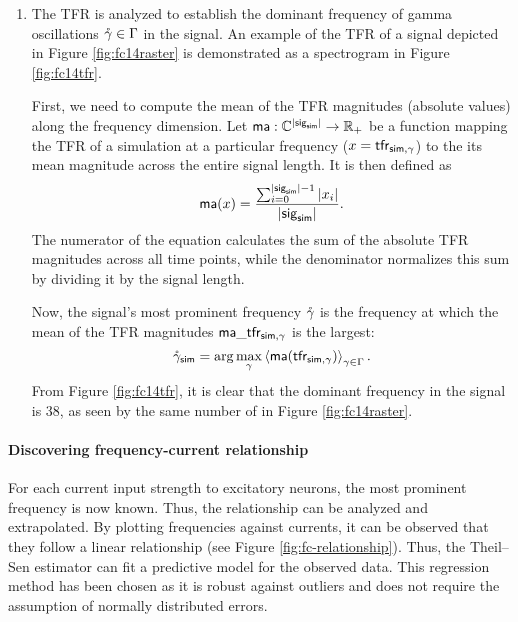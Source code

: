 \begin{enumerate}
    \item The TFR is analyzed to establish the dominant frequency of gamma oscillations $\mathring{\gamma} \in \Gamma$ in the signal. An example of the TFR of a signal depicted in Figure \ref{fig:fc14raster} is demonstrated as a spectrogram in Figure \ref{fig:fc14tfr}.

    First, we need to compute the mean of the TFR magnitudes (absolute values) along the frequency dimension. Let $\mathsf{ma}: \mathbb{C}^{|\mathsf{sig}_{\mathsf{sim}}|} \to \mathbb{R_+}$ be a function mapping the TFR of a simulation at a particular frequency ($x = \mathsf{tfr}_{\mathsf{sim}, \gamma}$) to the its mean magnitude across the entire signal length. It is then defined as
    \begin{equation}
        \mathsf{ma}(x) = 
        \frac{
            \sum_{i=0}^{|\mathsf{sig}_{\mathsf{sim}}| - 1} 
            |x_i|
        }{
           |\mathsf{sig}_{\mathsf{sim}}|
        }.
    \end{equation}
    The numerator of the equation calculates the sum of the absolute TFR magnitudes across all time points, while the denominator normalizes this sum by dividing it by the signal length.

    Now, the signal's most prominent frequency $\mathring{\gamma}$ is the frequency at which the mean of the TFR magnitudes $\mathsf{ma}\_\mathsf{tfr}_{\mathsf{sim}, \gamma}$ is the largest: 
    \begin{equation}
        \mathring{\gamma}_{\mathsf{sim}} = \arg \max_\gamma \left<
            \mathsf{ma}(\mathsf{tfr}_{\mathsf{sim}, \gamma})
        \right>_{\gamma \in \Gamma}.
    \end{equation}
    From Figure \ref{fig:fc14tfr}, it is clear that the dominant frequency in the signal is 38, as seen by the same number of  in Figure \ref{fig:fc14raster}.
\end{enumerate}


\paragraph{Discovering frequency-current relationship}

For each current input strength to excitatory neurons, the most prominent frequency is now known. Thus, the relationship can be analyzed and extrapolated. By plotting frequencies against currents, it can be observed that they follow a linear relationship (see Figure \ref{fig:fc-relationship}). Thus, the Theil–Sen estimator can fit a predictive model for the observed data. This regression method has been chosen as it is robust against outliers and does not require the assumption of normally distributed errors. 

